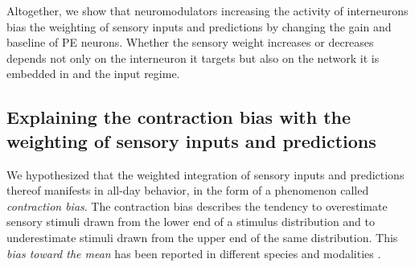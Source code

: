 \documentclass[10pt,a4paper]{article}
\begin{document}
Altogether, we show that neuromodulators increasing the activity of interneurons bias the weighting of sensory inputs and predictions by changing the gain and baseline of PE neurons. Whether the sensory weight increases or decreases depends not only on the interneuron it targets but also on the network it is embedded in and the input regime.


\subsection*{Explaining the contraction bias with the weighting of sensory inputs and predictions}
% 
We hypothesized that the weighted integration of sensory inputs and predictions thereof manifests in all-day behavior, in the form of a phenomenon called \textit{contraction bias}. The contraction bias describes the tendency to overestimate sensory stimuli drawn from the lower end of a stimulus distribution and to underestimate stimuli drawn from the upper end of the same distribution. This \textit{bias toward the mean} has been reported in different species and modalities \citep{hollingworth1910central, jazayeri2010temporal, ashourian2011bayesian, petzschner2011iterative, akrami2018posterior, meirhaeghe2021precise}. 
%
\end{document}

